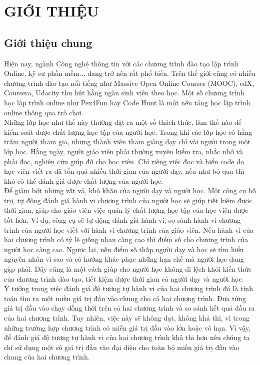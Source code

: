 \newpage
\chapter{GIỚI THIỆU}
\section{Giới thiệu chung}
Hiện nay, ngành Công nghệ thông tin với các chương trình đào tạo lập trình Online, kỹ sư phần mềm... đang trở nên rất phổ biến. Trên thế giới cũng có nhiều chương trình đào tạo nổi tiếng như Massive Open Online Courses (MOOC), edX, Coursera, Udacity thu hút hằng ngàn sinh viên theo học. Một số chương trình học lập trình online như Pex4Fun hay Code Hunt là một nền tảng học lập trình online thông qua trò chơi.\\

Những lớp học như thế này thường đặt ra một số thách thức, làm thế nào để kiểm soát được chất lượng học tập của người học. Trong khi các lớp học có hằng trăm người tham gia, nhưng thành viên tham giảng dạy chỉ vài người trong một lớp học. Hằng ngày, người giáo viên phải thường xuyên kiểm tra, nhắc nhở và phải đọc, nghiên cứu giúp đỡ cho học viên. Chỉ riêng việc đọc và hiểu code do học viên viết ra đã tốn quá nhiều thời gian của người dạy, nếu như bỏ qua thì khó có thể đánh giá được chất lượng của người học.\\

Để giảm bớt những vất vả, khó khăn của người dạy và người học. Một công cụ hỗ trợ, tự động đánh giá hành vi chương trình của người học sẽ giúp tiết kiệm được thời gian, giúp cho giáo viên việc quản lý chất lượng học tập của học viên được tốt hơn. Ví dụ, công cụ sẽ tự động đánh giá hành vi, so sánh hành vi chương trình của người học viết với hành vi chương trình của giáo viên. Nếu hành vi của hai chương trình có tỷ lệ giống nhau càng cao thì điểm số cho chương trình của người học càng cao. Ngược lại, nếu điểm số thấp người dạy và học sẽ tìm hiểu nguyên nhân vì sao và có hướng khác phục những hạn chế mà người học đang gặp phải. Đây cũng là một cách giúp cho người học không đi lệch khỏi kiến thức của chương trình đào tạo, tiết kiệm được thời gian cả người dạy và người học.\\

Ý tưởng trong việc đánh giá độ tương tự hành vi của hai chương trình đó là tính toán tìm ra một miền giá trị đầu vào chung cho cả hai chương trình. Đưa từng giá trị đầu vào chạy đồng thời trên cả hai chương trình và so sánh kết quả đầu ra của hai chương trình. Tuy nhiên, việc này sẽ không đạt, không khả thi, vì trong những trường hợp chương trình có miền giá trị đầu vào lớn hoặc vô hạn. Vì vậy, để đánh giá độ tương tự hành vi của hai chương trình khả thi hơn nếu chúng ta chỉ sử dụng một sô giá trị đầu vào đại diện cho toàn bộ miền giá trị đầu vào chung của hai chương trình.\\


